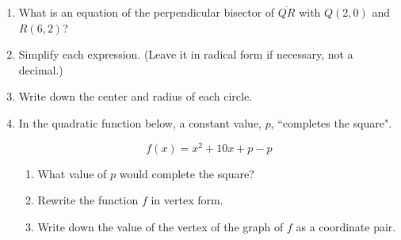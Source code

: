 \documentclass[12pt, twoside]{article}
\begin{document}
\begin{enumerate}
    \item What is an equation of the perpendicular bisector of $\overline{QR}$ with $Q(2,0)$ and $R(6,2)$? %


 \newpage

  \item Simplify each expression. (Leave it in radical form if necessary, not a decimal.)
    \begin{enumerate}
    \end{enumerate}
    \vspace{0.5cm}


  \item Write down the center and radius of each circle.
    \begin{enumerate}
    \end{enumerate}  \vspace{2cm}

  \item In the quadratic function below, a constant value, $p$, ``completes the square".

    \[f(x) = x^2+10x+p-p\]

    \begin{enumerate}
      \item What value of $p$ would complete the square? \vspace{1cm}
      \item Rewrite the function $f$ in vertex form. \vspace{3cm}
      \item Write down the value of the vertex of the graph of $f$ as a coordinate pair.  \vspace{2cm}
    \end{enumerate}


\end{enumerate}
\end{document}

